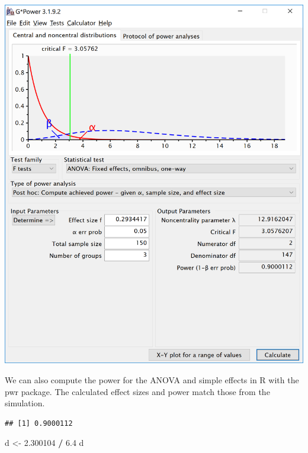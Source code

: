 \documentclass[]{book}
\newenvironment{Shaded}{\begin{snugshade}}{\end{snugshade}}
\newcommand{\DataTypeTok}[1]{\textcolor[rgb]{0.13,0.29,0.53}{#1}}
\newcommand{\DecValTok}[1]{\textcolor[rgb]{0.00,0.00,0.81}{#1}}
\newcommand{\FloatTok}[1]{\textcolor[rgb]{0.00,0.00,0.81}{#1}}
\newcommand{\KeywordTok}[1]{\textcolor[rgb]{0.13,0.29,0.53}{\textbf{#1}}}
\newcommand{\NormalTok}[1]{#1}
\newcommand{\OperatorTok}[1]{\textcolor[rgb]{0.81,0.36,0.00}{\textbf{#1}}}
\newcommand{\StringTok}[1]{\textcolor[rgb]{0.31,0.60,0.02}{#1}}
\begin{document}
\includegraphics{screenshots/gpower_7.png}

We can also compute the power for the ANOVA and simple effects in R with the pwr package. The calculated effect sizes and power match those from the simulation.

\begin{Shaded}
\end{Shaded}

\begin{verbatim}
## [1] 0.9000112
\end{verbatim}

\begin{Shaded}
\begin{Highlighting}[]
\NormalTok{d <-}\StringTok{ }\FloatTok{2.300104} \OperatorTok{/}\StringTok{ }\FloatTok{6.4}
\NormalTok{d}
\end{Highlighting}
\end{Shaded}
\end{document}
